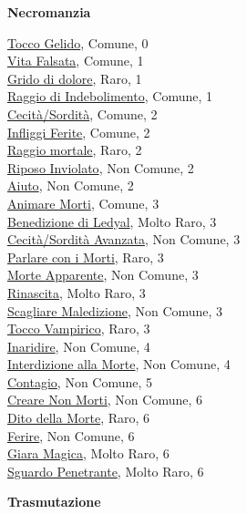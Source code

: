 \begin{multicols}{3}
{{\medskip\textbf{Necromanzia}

\hyperlink{Tocco Gelido}{Tocco Gelido}, Comune, 0\\
\hyperlink{Vita Falsata}{Vita Falsata}, Comune, 1\\
\hyperlink{Grido di dolore}{Grido di dolore}, Raro, 1\\
\hyperlink{Raggio di Indebolimento}{Raggio di Indebolimento}, Comune, 1\\
\hyperlink{Cecità/Sordità}{Cecità/Sordità}, Comune, 2\\
\hyperlink{Infliggi Ferite}{Infliggi Ferite}, Comune, 2\\
\hyperlink{Raggio mortale}{Raggio mortale}, Raro, 2\\
\hyperlink{Riposo Inviolato}{Riposo Inviolato}, Non Comune, 2\\
\hyperlink{Aiuto}{Aiuto}, Non Comune, 2\\
\hyperlink{Animare Morti}{Animare Morti}, Comune, 3\\
\hyperlink{Benedizione di Ledyal}{Benedizione di Ledyal}, Molto Raro, 3\\
\hyperlink{Cecità/Sordità Avanzata}{Cecità/Sordità Avanzata}, Non Comune, 3\\
\hyperlink{Parlare con i Morti}{Parlare con i Morti}, Raro, 3\\
\hyperlink{Morte Apparente}{Morte Apparente}, Non Comune, 3\\
\hyperlink{Rinascita}{Rinascita}, Molto Raro, 3\\
\hyperlink{Scagliare Maledizione}{Scagliare Maledizione}, Non Comune, 3\\
\hyperlink{Tocco Vampirico}{Tocco Vampirico}, Raro, 3\\
\hyperlink{Inaridire}{Inaridire}, Non Comune, 4\\
\hyperlink{Interdizione alla Morte}{Interdizione alla Morte}, Non Comune, 4\\
\hyperlink{Contagio}{Contagio}, Non Comune, 5\\
\hyperlink{Creare Non Morti}{Creare Non Morti}, Non Comune, 6\\
\hyperlink{Dito della Morte}{Dito della Morte}, Raro, 6\\
\hyperlink{Ferire}{Ferire}, Non Comune, 6\\
\hyperlink{Giara Magica}{Giara Magica}, Molto Raro, 6\\
\hyperlink{Sguardo Penetrante}{Sguardo Penetrante}, Molto Raro, 6

\medskip\textbf{Trasmutazione}

}}
\end{multicols}
